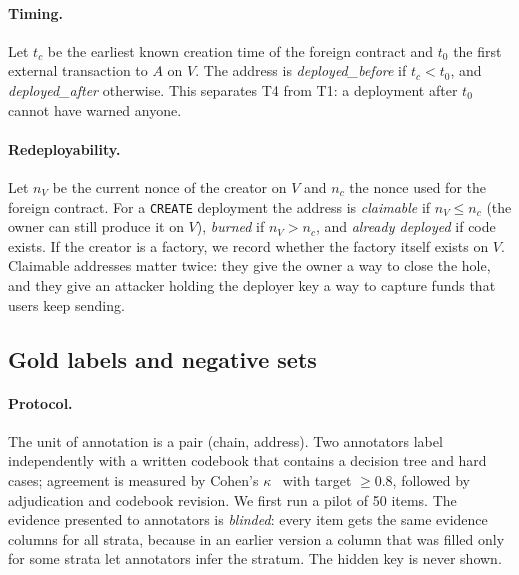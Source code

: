 \documentclass[runningheads]{llncs}
\begin{document}
\paragraph{Timing.} Let $t_c$ be the earliest known creation time of the foreign
contract and $t_0$ the first external transaction to $A$ on $V$. The address is
\emph{deployed\_before} if $t_c<t_0$, and \emph{deployed\_after} otherwise. This
separates T4 from T1: a deployment after $t_0$ cannot have warned anyone.

\paragraph{Redeployability.} Let $n_V$ be the current nonce of the creator on $V$
and $n_c$ the nonce used for the foreign contract. For a \texttt{CREATE}
deployment the address is \emph{claimable} if $n_V\le n_c$ (the owner can still
produce it on $V$), \emph{burned} if $n_V>n_c$, and \emph{already deployed} if
code exists. If the creator is a factory, we record whether the factory itself
exists on $V$. Claimable addresses matter twice: they give the owner a way to
close the hole, and they give an attacker holding the deployer key a way to
capture funds that users keep sending.

\subsection{Gold labels and negative sets}
\label{sec:gold}
\paragraph{Protocol.} The unit of annotation is a pair (chain, address). Two
annotators label independently with a written codebook that contains a decision
tree and hard cases; agreement is measured by Cohen's $\kappa$~\cite{cohen1960kappa} with target
$\ge0.8$, followed by adjudication and codebook revision. We first run a pilot
of 50 items. The evidence presented to annotators is \emph{blinded}: every item
gets the same evidence columns for all strata, because in an earlier version a
column that was filled only for some strata let annotators infer the stratum.
The hidden key is never shown.
\end{document}
